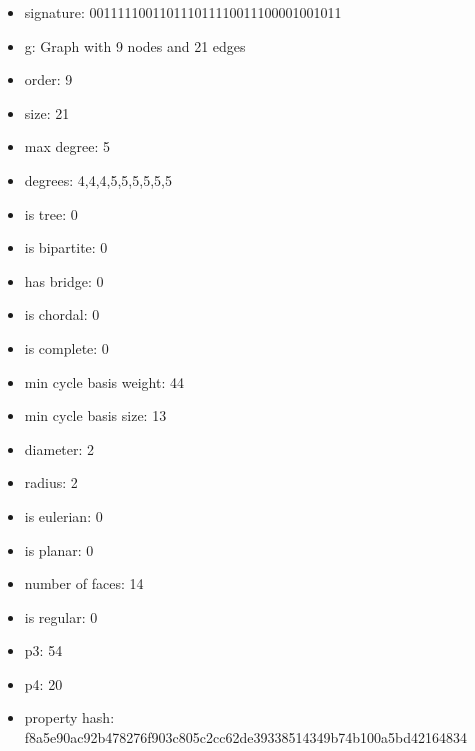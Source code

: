 \newpage
\begin{figure}
\end{figure}
\begin{itemize}
\item signature: 001111100110111011110011100001001011
\item g: Graph with 9 nodes and 21 edges
\item order: 9
\item size: 21
\item max degree: 5
\item degrees: 4,4,4,5,5,5,5,5,5
\item is tree: 0
\item is bipartite: 0
\item has bridge: 0
\item is chordal: 0
\item is complete: 0
\item min cycle basis weight: 44
\item min cycle basis size: 13
\item diameter: 2
\item radius: 2
\item is eulerian: 0
\item is planar: 0
\item number of faces: 14
\item is regular: 0
\item p3: 54
\item p4: 20
\item property hash: f8a5e90ac92b478276f903c805c2cc62de39338514349b74b100a5bd42164834
\end{itemize}
